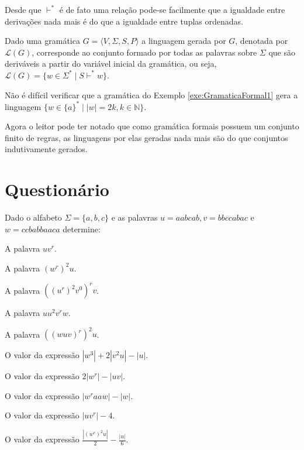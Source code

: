 Desde que $\vdash^*$ é de fato uma relação pode-se facilmente que a igualdade entre derivações nada mais é do que a igualdade entre tuplas ordenadas.

\begin{definicao}\label{def:LinaugemGramatica}
	Dado uma gramática $G = \langle V, \Sigma, S, P \rangle$ a linguagem gerada por $G$, denotada por $\mathcal{L}(G)$, corresponde ao conjunto formado por todas as palavras sobre $\Sigma$ que são deriváveis a partir do variável inicial da gramática, ou seja, $\mathcal{L}(G) = \{w \in \Sigma^* \mid S \vdash^* w\}$.
\end{definicao}

\begin{exemplo}
	Não é difícil verificar que a gramática do Exemplo \ref{exe:GramaticaFormal1} gera a linguagem $\{w \in \{a\}^* \mid |w| = 2k, k \in \mathbb{N}\}$.
\end{exemplo}

Agora o leitor pode ter notado que como gramática formais possuem um conjunto finito de regras, as linguagens por elas geradas nada mais são do que conjuntos indutivamente gerados.

\section{Questionário}\label{sec:Questionario1part4}

\begin{questao}\label{exer:LF1}
	Dado o alfabeto $\Sigma = \{a, b, c\}$ e as palavras $u = aabcab, v = bbccabac$ e $w = ccbabbaaca$ determine:
\end{questao}

\begin{exerList}
	\item A palavra $uv^r$.
	\item A palavra $(w^r)^2u$.
	\item A palavra $((u^r)^2v^0)^rv$.
	\item A palavra $uu^2v^rw$.
	\item A palavra $((wuv)^r)^2u$.
	\item O valor da expressão $|w^3| + 2|v^2u| - |u|$.
	\item O valor da expressão $2|w^r| - |uv|$.
	\item O valor da expressão $|w^raaw| - |w|$.
	\item O valor da expressão $|uv^r| - 4$.
	\item O valor da expressão $\frac{|(w^r)^2u|}{2} - \frac{|u|}{6}$.
\end{exerList}

